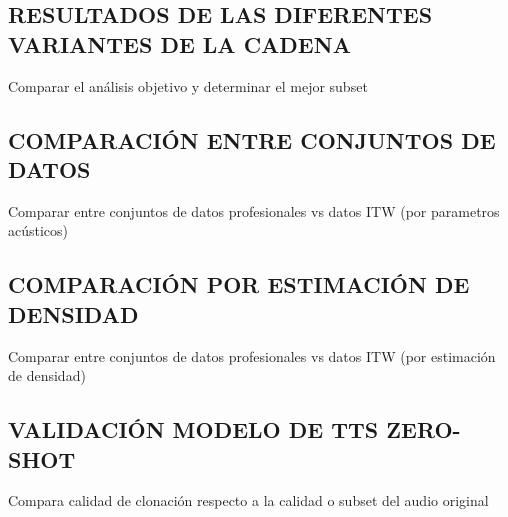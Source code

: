 \subsection{RESULTADOS DE LAS DIFERENTES VARIANTES DE LA CADENA}
Comparar el análisis objetivo y determinar el mejor subset

\subsection{COMPARACIÓN ENTRE CONJUNTOS DE DATOS}
Comparar entre conjuntos de datos profesionales vs datos ITW (por parametros acústicos)

\subsection{COMPARACIÓN POR ESTIMACIÓN DE DENSIDAD}
Comparar entre conjuntos de datos profesionales vs datos ITW (por estimación de densidad)

\subsection{VALIDACIÓN MODELO DE TTS ZERO-SHOT}
Compara calidad de clonación respecto a la calidad o subset del audio original
